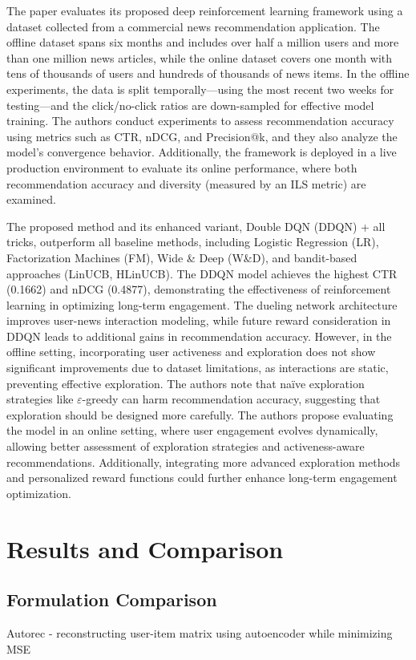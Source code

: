 \documentclass{ieeetj}
\begin{document}
The paper evaluates its proposed deep reinforcement learning framework using a dataset collected from a commercial news recommendation application. The offline dataset spans six months and includes over half a million users and more than one million news articles, while the online dataset covers one month with tens of thousands of users and hundreds of thousands of news items. In the offline experiments, the data is split temporally—using the most recent two weeks for testing—and the click/no-click ratios are down-sampled for effective model training. The authors conduct experiments to assess recommendation accuracy using metrics such as CTR, nDCG, and Precision@k, and they also analyze the model’s convergence behavior. Additionally, the framework is deployed in a live production environment to evaluate its online performance, where both recommendation accuracy and diversity (measured by an ILS metric) are examined.


The proposed method and its enhanced variant, Double DQN (DDQN) + all tricks, outperform all baseline methods, including Logistic Regression (LR), Factorization Machines (FM), Wide \& Deep (W\&D), and bandit-based approaches (LinUCB, HLinUCB). The DDQN model achieves the highest CTR (0.1662) and nDCG (0.4877), demonstrating the effectiveness of reinforcement learning in optimizing long-term engagement. The dueling network architecture improves user-news interaction modeling, while future reward consideration in DDQN leads to additional gains in recommendation accuracy. However, in the offline setting, incorporating user activeness and exploration does not show significant improvements due to dataset limitations, as interactions are static, preventing effective exploration. The authors note that na\"{i}ve exploration strategies like $\varepsilon$-greedy can harm recommendation accuracy, suggesting that exploration should be designed more carefully. The authors propose evaluating the model in an online setting, where user engagement evolves dynamically, allowing better assessment of exploration strategies and activeness-aware recommendations. Additionally, integrating more advanced exploration methods and personalized reward functions could further enhance long-term engagement optimization.

\section{Results and Comparison}
\subsection{Formulation Comparison}
Autorec - reconstructing user-item matrix using autoencoder while minimizing MSE
\end{document}
